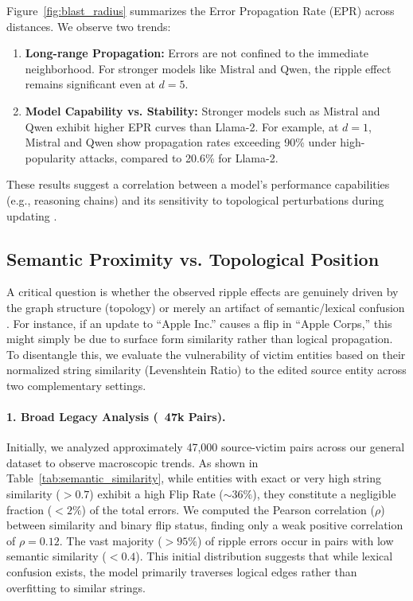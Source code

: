 Figure~\ref{fig:blast_radius} summarizes the Error Propagation Rate (EPR) across distances. We observe two trends:
\begin{enumerate}
    \item \textbf{Long-range Propagation:} Errors are not confined to the immediate neighborhood. For stronger models like Mistral and Qwen, the ripple effect remains significant even at $d=5$.
    \item \textbf{Model Capability vs. Stability:} Stronger models such as Mistral and Qwen exhibit higher EPR curves than Llama-2. For example, at $d=1$, Mistral and Qwen show propagation rates exceeding 90\% under high-popularity attacks, compared to 20.6\% for Llama-2.
\end{enumerate}
These results suggest a correlation between a model's performance capabilities (e.g., reasoning chains) and its sensitivity to topological perturbations during updating \cite{wei2022chain}.

\subsection{Semantic Proximity vs. Topological Position}
\label{subsec:semantic_vs_topology}

A critical question is whether the observed ripple effects are genuinely driven by the graph structure (topology) or merely an artifact of semantic/lexical confusion \cite{mallen2023not}. For instance, if an update to ``Apple Inc.'' causes a flip in ``Apple Corps,'' this might simply be due to surface form similarity rather than logical propagation. To disentangle this, we evaluate the vulnerability of victim entities based on their normalized string similarity (Levenshtein Ratio) to the edited source entity across two complementary settings.

\paragraph{1. Broad Legacy Analysis (~47k Pairs).}
Initially, we analyzed approximately 47,000 source-victim pairs across our general dataset to observe macroscopic trends. As shown in Table~\ref{tab:semantic_similarity}, while entities with exact or very high string similarity ($>0.7$) exhibit a high Flip Rate ($\sim36\%$), they constitute a negligible fraction ($<2\%$) of the total errors. We computed the Pearson correlation ($\rho$) between similarity and binary flip status, finding only a weak positive correlation of $\rho = 0.12$. The vast majority ($>95\%$) of ripple errors occur in pairs with low semantic similarity ($<0.4$). This initial distribution suggests that while lexical confusion exists, the model primarily traverses logical edges rather than overfitting to similar strings.

